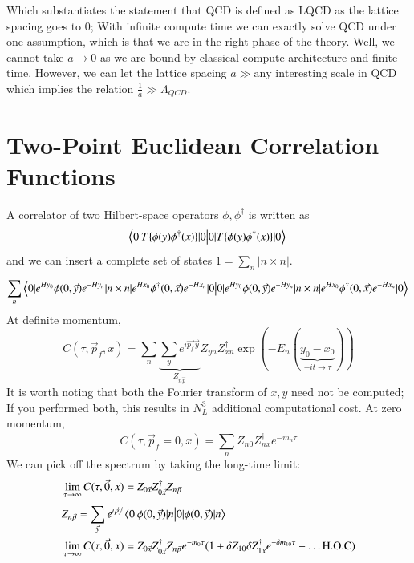 Which substantiates the statement that QCD is defined as LQCD as the lattice spacing goes to 0; With infinite compute time we can exactly solve QCD under one assumption, which is that we are in the right phase of the theory. Well, we cannot take $a\rightarrow 0$ as we are bound by classical compute architecture and finite time. However, we can let the lattice spacing $a \gg \text{any interesting scale in QCD}$ which implies the relation $\frac{1}{a} \gg \Lambda_{QCD}$. 

\section{Two-Point Euclidean Correlation Functions}
A correlator of two Hilbert-space operators $\phi,\phi^\dagger$ is written as 
\begin{equation}
    \braket{0|T\{\phi(y)\phi^{\dagger}(x)\}|0} \\
\end{equation}and we can insert a complete set of states $1 = \sum_{n}^{} |n\times n|$.
\begin{equation}
    \sum_{n}^{} \braket{0|e^{Hy_0}\phi(0,\vec{y})e^{-Hy_n} | n \times n | e^{Hx_0}\phi^{\dagger}(0,\vec{x})e^{-Hx_n}|0} \\
\end{equation} At definite momentum,
\begin{equation}
    C(\tau,\vec{p}_f,x) = \sum_{n}^{} \underbrace{\sum_{y}^{} e^{i\vec{p_f}\vec{y}}}_{Z_{n\vec{p}}} Z_{yn}Z_{xn}^\dagger \exp\left(-E_n(\underbrace{y_0-x_0}_{-it \to \tau})\right)    
\end{equation}
It is worth noting that both the Fourier transform of $x,y$ need not be computed; If you performed both, this results in $N_L^3$ additional computational cost. 
At zero momentum, 
\begin{equation}
    C(\tau,\vec{p}_f=0,x) = \sum_{n}^{} Z_{n0}Z_{nx}^\dagger e^{-m_n\tau} 
\end{equation} 
We can pick off the spectrum by taking the long-time limit: 
\begin{align}
    & \lim_{\tau \to \infty}C(\tau,\vec{0},x) = Z_{0\vec{x}}Z_{0\vec{x}}^\dagger Z_{n\vec{p}}  \\
    & Z_{n\vec{p}} = \sum_{\vec{y}}^{} e^{i\vec{p}\vec{y}}\braket{0|\phi(0,\vec{y})|n} \\ 
    & \lim_{\tau \to \infty}C(\tau,\vec{0},x) = Z_{0\vec{x}}Z_{0\vec{x}}^\dagger Z_{n\vec{p}}e^{-m_0\tau}(1+ \delta Z_{10}\delta Z_{1x}^\dagger e^{-\delta m_{10}\tau} + \dots \text{H.O.C})  \\
\end{align}
